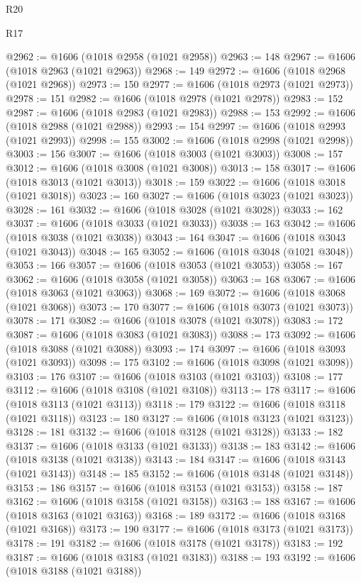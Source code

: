 \begin{lexlean}{R20}
\begin{lexlean}{R17}
\begin{coremodule}
{{{{{{{{{{{{{{{{{{{{{{{{{{{{{{{{{{{{{{{{{{{{{{{{{{{{{{{{{{{{{{{{{{{{{{{{{{{{{{{{{{{{{{{{{{{{{{{{{{{{{{{{{{{@2962 := @1606 (@1018 @2958 (@1021 @2958))
@2963 := 148
@2967 := @1606 (@1018 @2963 (@1021 @2963))
@2968 := 149
@2972 := @1606 (@1018 @2968 (@1021 @2968))
@2973 := 150
@2977 := @1606 (@1018 @2973 (@1021 @2973))
@2978 := 151
@2982 := @1606 (@1018 @2978 (@1021 @2978))
@2983 := 152
@2987 := @1606 (@1018 @2983 (@1021 @2983))
@2988 := 153
@2992 := @1606 (@1018 @2988 (@1021 @2988))
@2993 := 154
@2997 := @1606 (@1018 @2993 (@1021 @2993))
@2998 := 155
@3002 := @1606 (@1018 @2998 (@1021 @2998))
@3003 := 156
@3007 := @1606 (@1018 @3003 (@1021 @3003))
@3008 := 157
@3012 := @1606 (@1018 @3008 (@1021 @3008))
@3013 := 158
@3017 := @1606 (@1018 @3013 (@1021 @3013))
@3018 := 159
@3022 := @1606 (@1018 @3018 (@1021 @3018))
@3023 := 160
@3027 := @1606 (@1018 @3023 (@1021 @3023))
@3028 := 161
@3032 := @1606 (@1018 @3028 (@1021 @3028))
@3033 := 162
@3037 := @1606 (@1018 @3033 (@1021 @3033))
@3038 := 163
@3042 := @1606 (@1018 @3038 (@1021 @3038))
@3043 := 164
@3047 := @1606 (@1018 @3043 (@1021 @3043))
@3048 := 165
@3052 := @1606 (@1018 @3048 (@1021 @3048))
@3053 := 166
@3057 := @1606 (@1018 @3053 (@1021 @3053))
@3058 := 167
@3062 := @1606 (@1018 @3058 (@1021 @3058))
@3063 := 168
@3067 := @1606 (@1018 @3063 (@1021 @3063))
@3068 := 169
@3072 := @1606 (@1018 @3068 (@1021 @3068))
@3073 := 170
@3077 := @1606 (@1018 @3073 (@1021 @3073))
@3078 := 171
@3082 := @1606 (@1018 @3078 (@1021 @3078))
@3083 := 172
@3087 := @1606 (@1018 @3083 (@1021 @3083))
@3088 := 173
@3092 := @1606 (@1018 @3088 (@1021 @3088))
@3093 := 174
@3097 := @1606 (@1018 @3093 (@1021 @3093))
@3098 := 175
@3102 := @1606 (@1018 @3098 (@1021 @3098))
@3103 := 176
@3107 := @1606 (@1018 @3103 (@1021 @3103))
@3108 := 177
@3112 := @1606 (@1018 @3108 (@1021 @3108))
@3113 := 178
@3117 := @1606 (@1018 @3113 (@1021 @3113))
@3118 := 179
@3122 := @1606 (@1018 @3118 (@1021 @3118))
@3123 := 180
@3127 := @1606 (@1018 @3123 (@1021 @3123))
@3128 := 181
@3132 := @1606 (@1018 @3128 (@1021 @3128))
@3133 := 182
@3137 := @1606 (@1018 @3133 (@1021 @3133))
@3138 := 183
@3142 := @1606 (@1018 @3138 (@1021 @3138))
@3143 := 184
@3147 := @1606 (@1018 @3143 (@1021 @3143))
@3148 := 185
@3152 := @1606 (@1018 @3148 (@1021 @3148))
@3153 := 186
@3157 := @1606 (@1018 @3153 (@1021 @3153))
@3158 := 187
@3162 := @1606 (@1018 @3158 (@1021 @3158))
@3163 := 188
@3167 := @1606 (@1018 @3163 (@1021 @3163))
@3168 := 189
@3172 := @1606 (@1018 @3168 (@1021 @3168))
@3173 := 190
@3177 := @1606 (@1018 @3173 (@1021 @3173))
@3178 := 191
@3182 := @1606 (@1018 @3178 (@1021 @3178))
@3183 := 192
@3187 := @1606 (@1018 @3183 (@1021 @3183))
@3188 := 193
@3192 := @1606 (@1018 @3188 (@1021 @3188))
}}}}}}}}}}}}}}}}}}}}}}}}}}}}}}}}}}}}}}}}}}}}}}}}}}}}}}}}}}}}}}}}}}}}}}}}}}}}}}}}}}}}}}}}}}}}}}}}}}}}}}}}}}}
\end{coremodule}
\end{lexlean}
\end{lexlean}
